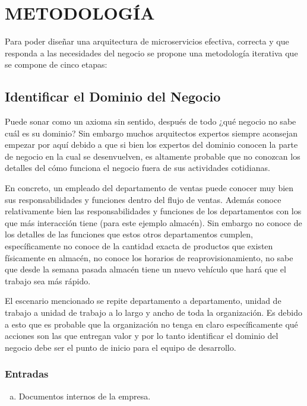 \section{METODOLOGÍA}

Para poder diseñar una arquitectura de microservicios efectiva, correcta y que responda a las
necesidades del negocio se propone una metodología iterativa que se compone de cinco etapas:


\subsection{Identificar el Dominio del Negocio}

Puede sonar como un axioma sin sentido, después de todo ¿qué negocio no sabe cuál es su dominio?
Sin embargo muchos arquitectos expertos siempre aconsejan empezar por aquí debido a que si bien los
expertos del dominio conocen la parte de negocio en la cual se desenvuelven, es altamente probable
que no conozcan los detalles del cómo funciona el negocio fuera de sus actividades cotidianas.

En concreto, un empleado del departamento de ventas puede conocer muy bien sus responsabilidades
y funciones dentro del flujo de ventas.
Además conoce relativamente bien las responsabilidades y funciones de los departamentos con los que más
interacción tiene (para este ejemplo almacén).
Sin embargo no conoce de los detalles de las funciones que estos otros departamentos cumplen, específicamente
no conoce de la cantidad exacta de productos que existen físicamente en almacén, no conoce los horarios
de reaprovisionamiento, no sabe que desde la semana pasada almacén tiene un nuevo vehículo que hará que
el trabajo sea más rápido.

El escenario mencionado se repite departamento a departamento, unidad de trabajo a unidad de trabajo
a lo largo y ancho de toda la organización.
Es debido a esto que es probable que la organización no tenga en claro específicamente qué acciones
son las que entregan valor y por lo tanto identificar el dominio del negocio debe ser el punto de inicio
para el equipo de desarrollo.

\subsubsection*{Entradas}
\begin{enumerate}[a.]
	\item Documentos internos de la empresa.
\end{enumerate}

